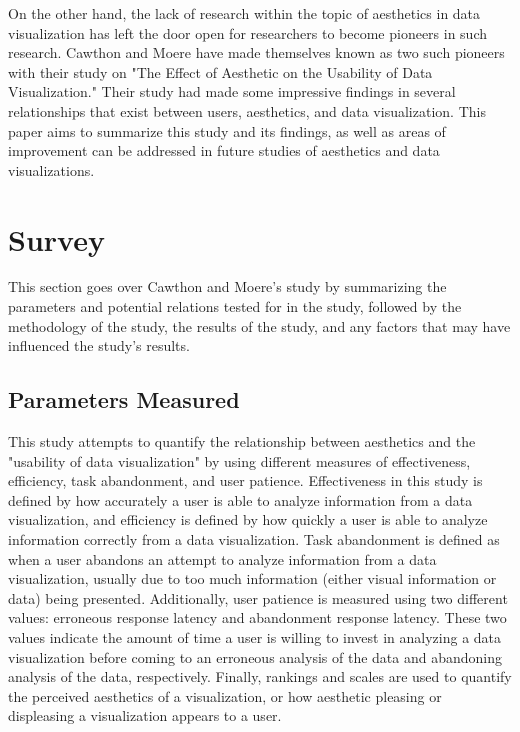 \documentclass[twocolumn]{article}
\newcommand{\forceindent}{\leavevmode{\parindent=2em\indent}}
\begin{document}
		\forceindent On the other hand, the lack of research within the topic of aesthetics in data visualization has left the door open for researchers to become pioneers in such research. Cawthon and Moere \cite{1} have made themselves known as two such pioneers with their study on "The Effect of Aesthetic on the Usability of Data Visualization." Their study had made some impressive findings in several relationships that exist between users, aesthetics, and data visualization. This paper aims to summarize this study and its findings, as well as areas of improvement can be addressed in future studies of aesthetics and data visualizations.
		
	\section{Survey}
	\forceindent This section goes over Cawthon and Moere's study by summarizing the parameters and potential relations tested for in the study, followed by the methodology of the study, the results of the study, and any factors that may have influenced the study's results.
	
		\subsection{Parameters Measured}
		
		\forceindent This study attempts to quantify the relationship between aesthetics and the "usability of data visualization" by using different measures of effectiveness, efficiency, task abandonment, and user patience. Effectiveness in this study is defined by how accurately a user is able to analyze information from a data visualization, and efficiency is defined by how quickly a user is able to analyze information correctly from a data visualization. Task abandonment is defined as when a user abandons an attempt to analyze information from a data visualization, usually due to too much information (either visual information or data) being presented. Additionally, user patience is measured using two different values: erroneous response latency and abandonment response latency. These two values indicate the amount of time a user is willing to invest in analyzing a data visualization before coming to an erroneous analysis of the data and abandoning analysis of the data, respectively. Finally, rankings and scales are used to quantify the perceived aesthetics of a visualization, or how aesthetic pleasing or displeasing a visualization appears to a user.
		
\end{document}
